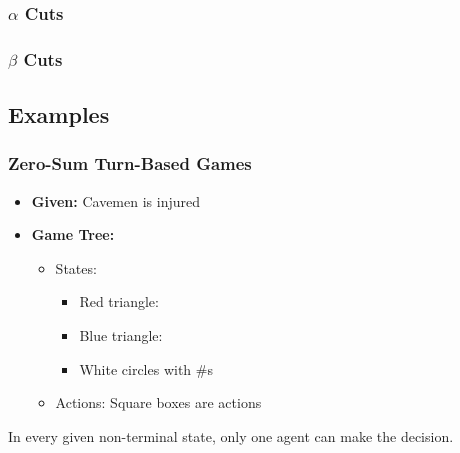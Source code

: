 \subsubsection{$\alpha$ Cuts}

\subsubsection{$\beta$ Cuts}

\subsection{Examples}

\subsubsection{Zero-Sum Turn-Based Games}
\begin{example}
    \begin{itemize}
        \item \textbf{Given:} Cavemen is injured 
        \item \textbf{Game Tree:}
        \begin{itemize}
            \item States:
            \begin{itemize}
                \item Red triangle:
                \item Blue triangle: 
                \item White circles with \#s
            \end{itemize}
            \item Actions: Square boxes are actions
        \end{itemize}
    \end{itemize}
\end{example}

\begin{warning}
    In every given non-terminal state, only one agent can make the decision. 
\end{warning}